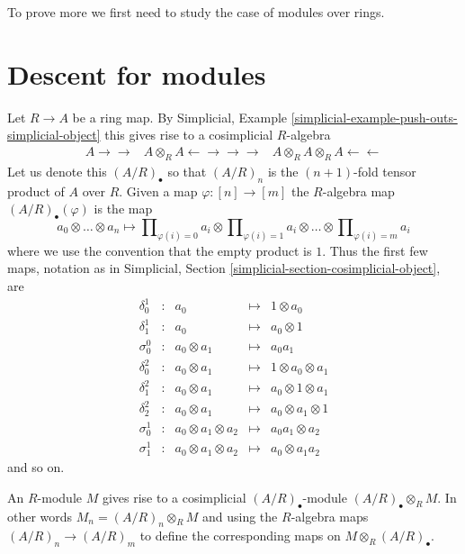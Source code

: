 To prove more we first need to study the case of modules over rings.

\section{Descent for modules}
\label{descent-section-descent-modules}
Let $R \to A$ be a ring map.
By Simplicial, Example \ref{simplicial-example-push-outs-simplicial-object}
this gives rise to a cosimplicial $R$-algebra
$$
\begin{array}{ccc}A
\longrightarrow\longrightarrow & A \otimes_R A
\longleftarrow\longrightarrow\longrightarrow\longrightarrow & A \otimes_R A \otimes_R A
\longleftarrow\longleftarrow\end{array}
$$
Let us denote this $(A/R)_\bullet$ so that $(A/R)_n$ is the $(n + 1)$-fold
tensor product of $A$ over $R$. Given a map
$\varphi : [n] \to [m]$ the $R$-algebra map $(A/R)_\bullet(\varphi)$
is the map
$$
a_0 \otimes \ldots \otimes a_n
\longmapsto
\prod\nolimits_{\varphi(i) = 0} a_i
\otimes
\prod\nolimits_{\varphi(i) = 1} a_i
\otimes \ldots \otimes
\prod\nolimits_{\varphi(i) = m} a_i
$$
where we use the convention that the empty product is $1$. Thus the first
few maps, notation as in
Simplicial, Section \ref{simplicial-section-cosimplicial-object}, are
$$
\begin{matrix}
\delta^1_0 & : & a_0 & \mapsto & 1 \otimes a_0 \\
\delta^1_1 & : & a_0 & \mapsto & a_0 \otimes 1 \\
\sigma^0_0 & : & a_0 \otimes a_1 & \mapsto & a_0a_1 \\
\delta^2_0 & : & a_0 \otimes a_1 & \mapsto & 1 \otimes a_0 \otimes a_1 \\
\delta^2_1 & : & a_0 \otimes a_1 & \mapsto & a_0 \otimes 1 \otimes a_1 \\
\delta^2_2 & : & a_0 \otimes a_1 & \mapsto & a_0 \otimes a_1 \otimes 1 \\
\sigma^1_0 & : & a_0 \otimes a_1 \otimes a_2 & \mapsto & a_0a_1 \otimes a_2 \\
\sigma^1_1 & : & a_0 \otimes a_1 \otimes a_2 & \mapsto & a_0 \otimes a_1a_2
\end{matrix}
$$
and so on.

\medskip\noindent
An $R$-module $M$ gives rise to a cosimplicial $(A/R)_\bullet$-module
$(A/R)_\bullet \otimes_R M$. In other words
$M_n = (A/R)_n \otimes_R M$ and using the $R$-algebra maps
$(A/R)_n \to (A/R)_m$ to define the corresponding maps on
$M \otimes_R (A/R)_\bullet$.

